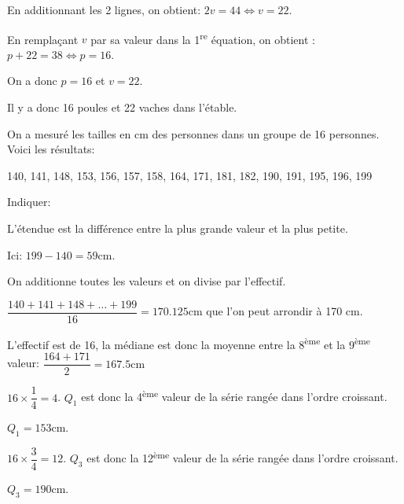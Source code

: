 \documentclass[a4paper,12pt]{scrartcl}
\begin{document}
En additionnant les 2 lignes, on obtient: $2v = 44 \Leftrightarrow v = 22$.

En remplaçant $v$ par sa valeur dans la 1\textsuperscript{re} équation, on obtient : $p+22 = 38 \Leftrightarrow p = 16$.

On a donc $p = 16$ et $v = 22$. 

Il y a donc 16 poules et 22 vaches dans l'étable. 


On a mesuré les tailles en cm des personnes dans un groupe de 16 personnes. Voici les résultats:

140, 141, 148, 153, 156, 157, 158, 164, 171, 181, 182, 190, 191, 195, 196, 199

Indiquer:


L'étendue est la différence entre la plus grande valeur et la plus petite. 

Ici: $199 - 140 = 59 \mbox{cm}$.


On additionne toutes les valeurs et on divise par l'effectif.

$\dfrac{140 + 141 + 148 + \ldots + 199}{16} = 170.125 \mbox{cm}$ que l'on peut arrondir à 170 cm.


L'effectif est de 16, la médiane est donc la moyenne entre la 8\textsuperscript{ème} et la 9\textsuperscript{ème} valeur: $\dfrac{164+171}{2} = 167.5 \mbox{cm}$


$16 \times \dfrac{1}{4} = 4$. $Q_1$ est donc la 4\textsuperscript{ème} valeur de la série rangée dans l'ordre croissant. 

$Q_1 = 153\mbox{cm}$.

$16 \times \dfrac{3}{4} = 12$. $Q_3$ est donc la 12\textsuperscript{ème} valeur de la série rangée dans l'ordre croissant. 

$Q_3 = 190\mbox{cm}$.


\trait
\end{document}
